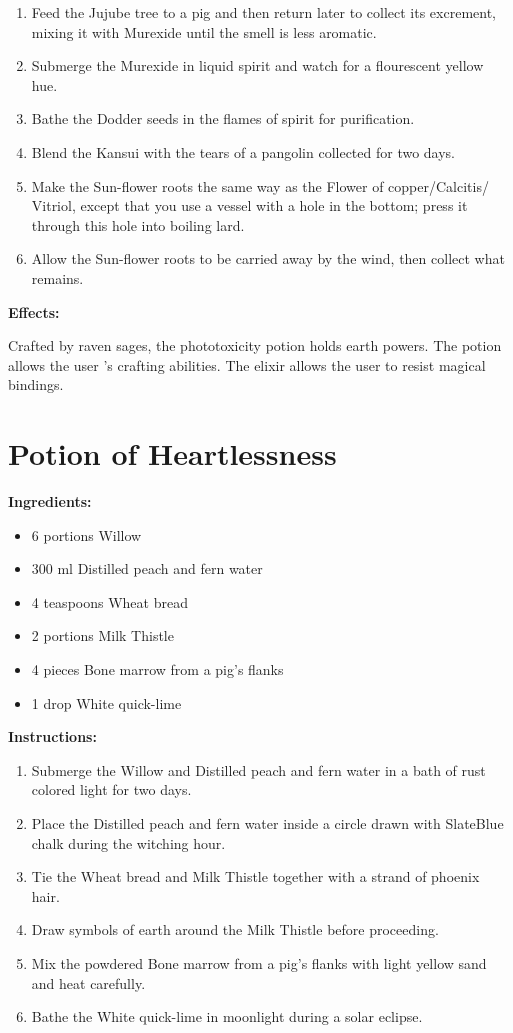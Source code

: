 \documentclass{article}
\begin{document}
\begin{enumerate}
  \item Feed the Jujube tree to a pig and then return later to collect its excrement, mixing it with Murexide until the smell is less aromatic.
  \item Submerge the Murexide in liquid spirit and watch for a flourescent yellow hue.
  \item Bathe the Dodder seeds in the flames of spirit for purification.
  \item Blend the Kansui with the tears of a pangolin collected for two days.
  \item Make the Sun-flower roots the same way as the Flower of copper/Calcitis/ Vitriol, except that you use a vessel with a hole in the bottom; press it through this hole into boiling lard.
  \item Allow the Sun-flower roots to be carried away by the wind, then collect what remains.
\end{enumerate}

\textbf{Effects:}

Crafted by raven sages, the phototoxicity potion holds earth powers. The potion allows the user 's crafting abilities. The elixir allows the user to resist magical bindings.

\newpage
\section*{Potion of Heartlessness}

\textbf{Ingredients:}

\begin{itemize}
  \item 6 portions Willow
  \item 300 ml Distilled peach and fern water
  \item 4 teaspoons Wheat bread
  \item 2 portions Milk Thistle
  \item 4 pieces Bone marrow from a pig's flanks
  \item 1 drop White quick-lime
\end{itemize}

\textbf{Instructions:}

\begin{enumerate}
  \item Submerge the Willow and Distilled peach and fern water in a bath of rust colored light for two days.
  \item Place the Distilled peach and fern water inside a circle drawn with SlateBlue chalk during the witching hour.
  \item Tie the Wheat bread and Milk Thistle together with a strand of phoenix hair.
  \item Draw symbols of earth around the Milk Thistle before proceeding.
  \item Mix the powdered Bone marrow from a pig's flanks with light yellow sand and heat carefully.
  \item Bathe the White quick-lime in moonlight during a solar eclipse.
\end{enumerate}
\end{document}
